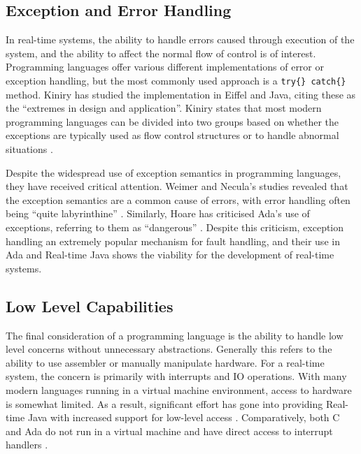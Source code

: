\subsection{Exception and Error Handling} %
In real-time systems, the ability to handle errors caused through execution of
the system, and the ability to affect the normal flow of control is of
interest. Programming languages offer various different implementations of
error or exception handling, but the most commonly used approach is a 
\texttt{try\{\} catch\{\} } method. Kiniry has studied the implementation in 
Eiffel and Java, citing these as the ``extremes in design and application''. 
Kiniry states that most modern programming languages can be divided into two
groups based on whether the exceptions are typically used as flow control
structures or to handle abnormal situations
\cite{Kiniry:2006:EJE:2124243.2124264}. 
\par\bigskip\noindent
Despite the widespread use of exception semantics in programming languages,
they have received critical attention. Weimer and Necula's studies revealed
that the exception semantics are a common cause of errors, with error handling
often being ``quite labyrinthine'' \cite{Weimer:2008:ESP:1330017.1330019}. 
Similarly, Hoare has criticised Ada's use of exceptions, referring to them as
``dangerous'' \cite{Hoare:1981:EOC:358549.358561}. Despite this criticism,
exception handling an extremely popular mechanism for fault handling, and their
use in Ada and Real-time Java shows the viability for the development of
real-time systems.

\subsection{Low Level Capabilities} %
The final consideration of a programming language is the ability to handle low
level concerns without unnecessary abstractions. Generally this refers to the
ability to use assembler or manually manipulate hardware. For a real-time
system, the concern is primarily with interrupts and IO operations. With many
modern languages running in a virtual machine environment, access to hardware
is somewhat limited. As a result, significant effort has gone into providing
Real-time Java with increased support for low-level access \cite{4519616,real-java}. 
Comparatively, both C and Ada do not run in a virtual machine and have direct
access to interrupt handlers \cite{real-time-systems}.

